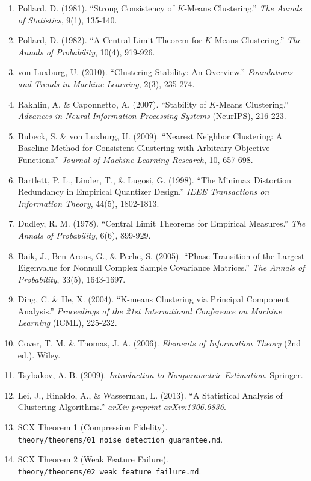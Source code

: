 \documentclass[
  12pt,
]{article}
\begin{document}
\begin{enumerate}
\def\labelenumi{\arabic{enumi}.}
\item
  Pollard, D. (1981). ``Strong Consistency of \(K\)-Means Clustering.''
  \emph{The Annals of Statistics}, 9(1), 135-140.
\item
  Pollard, D. (1982). ``A Central Limit Theorem for \(K\)-Means
  Clustering.'' \emph{The Annals of Probability}, 10(4), 919-926.
\item
  von Luxburg, U. (2010). ``Clustering Stability: An Overview.''
  \emph{Foundations and Trends in Machine Learning}, 2(3), 235-274.
\item
  Rakhlin, A. \& Caponnetto, A. (2007). ``Stability of \(K\)-Means
  Clustering.'' \emph{Advances in Neural Information Processing Systems}
  (NeurIPS), 216-223.
\item
  Bubeck, S. \& von Luxburg, U. (2009). ``Nearest Neighbor Clustering: A
  Baseline Method for Consistent Clustering with Arbitrary Objective
  Functions.'' \emph{Journal of Machine Learning Research}, 10, 657-698.
\item
  Bartlett, P. L., Linder, T., \& Lugosi, G. (1998). ``The Minimax
  Distortion Redundancy in Empirical Quantizer Design.'' \emph{IEEE
  Transactions on Information Theory}, 44(5), 1802-1813.
\item
  Dudley, R. M. (1978). ``Central Limit Theorems for Empirical
  Measures.'' \emph{The Annals of Probability}, 6(6), 899-929.
\item
  Baik, J., Ben Arous, G., \& Peche, S. (2005). ``Phase Transition of
  the Largest Eigenvalue for Nonnull Complex Sample Covariance
  Matrices.'' \emph{The Annals of Probability}, 33(5), 1643-1697.
\item
  Ding, C. \& He, X. (2004). ``K-means Clustering via Principal
  Component Analysis.'' \emph{Proceedings of the 21st International
  Conference on Machine Learning} (ICML), 225-232.
\item
  Cover, T. M. \& Thomas, J. A. (2006). \emph{Elements of Information
  Theory} (2nd ed.). Wiley.
\item
  Tsybakov, A. B. (2009). \emph{Introduction to Nonparametric
  Estimation}. Springer.
\item
  Lei, J., Rinaldo, A., \& Wasserman, L. (2013). ``A Statistical
  Analysis of Clustering Algorithms.'' \emph{arXiv preprint
  arXiv:1306.6836}.
\item
  SCX Theorem 1 (Compression Fidelity).
  \texttt{theory/theorems/01\_noise\_detection\_guarantee.md}.
\item
  SCX Theorem 2 (Weak Feature Failure).
  \texttt{theory/theorems/02\_weak\_feature\_failure.md}.
\end{enumerate}
\end{document}
